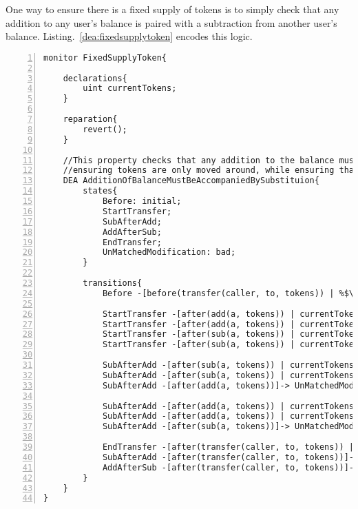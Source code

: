 \documentclass{article}
\newcommand{\tildearrow}{{\raise.37ex\hbox{$\scriptstyle\mathtt{\sim}$}}\hspace{-0.08cm}>\xspace}
\begin{document}
    One way to ensure there is a fixed supply of tokens is to simply check that any addition to any user's balance is paired with a subtraction from another user's balance. Listing.~\ref{dea:fixedsupplytoken} encodes this logic. 
    
        \small\begin{lstlisting}[language=DEA,basicstyle=\scriptsize,numbers=left,numbersep=2pt,xleftmargin=0.3cm,escapechar=\%,label={dea:fixedsupplytoken}]
monitor FixedSupplyToken{
  
    declarations{
        uint currentTokens;
    }
    
    reparation{
        revert();
    }

    //This property checks that any addition to the balance must be coupled immediately with a subtraction,
    //ensuring tokens are only moved around, while ensuring that any change is immediately (modulo one step) reflected in the total sum.
    DEA AdditionOfBalanceMustBeAccompaniedBySubstituion{
        states{
            Before: initial;
            StartTransfer;
            SubAfterAdd;
            AddAfterSub;
            EndTransfer;
            UnMatchedModification: bad;
        }
    
        transitions{
            Before -[before(transfer(caller, to, tokens)) | %$\tildearrow$% currentTokens = tokens;]-> StartTransfer;
            
            StartTransfer -[after(add(a, tokens)) | currentTokens == tokens]-> SubAfterAdd;
            StartTransfer -[after(add(a, tokens)) | currentTokens != tokens]-> UnMatchedModification;
            StartTransfer -[after(sub(a, tokens)) | currentTokens == tokens]-> AddAfterSub;
            StartTransfer -[after(sub(a, tokens)) | currentTokens != tokens]-> UnMatchedModification;
            
            SubAfterAdd -[after(sub(a, tokens)) | currentTokens == tokens]-> EndTransfer;
            SubAfterAdd -[after(sub(a, tokens)) | currentTokens != tokens]-> UnMatchedModification;
            SubAfterAdd -[after(add(a, tokens))]-> UnMatchedModification;
            
            SubAfterAdd -[after(add(a, tokens)) | currentTokens == tokens]-> EndTransfer;
            SubAfterAdd -[after(add(a, tokens)) | currentTokens != tokens]-> UnMatchedModification;
            SubAfterAdd -[after(sub(a, tokens))]-> UnMatchedModification;
        
            EndTransfer -[after(transfer(caller, to, tokens)) | %$\tildearrow$% currentTokens = 0;]-> Before;
            SubAfterAdd -[after(transfer(caller, to, tokens))]-> UnMatchedModification;
            AddAfterSub -[after(transfer(caller, to, tokens))]-> UnMatchedModification;
        }
    }
}
            \end{lstlisting}\normalsize
            
\end{document}
